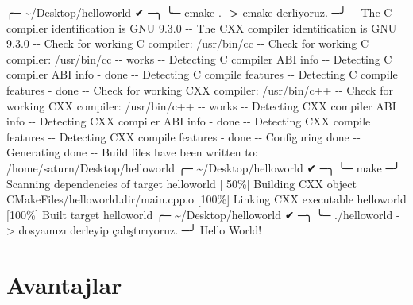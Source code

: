 \documentclass[
]{book}
\newenvironment{Shaded}{\begin{snugshade}}{\end{snugshade}}
\newcommand{\BuiltInTok}[1]{#1}
\newcommand{\ExtensionTok}[1]{#1}
\newcommand{\FunctionTok}[1]{\textcolor[rgb]{0.00,0.00,0.00}{#1}}
\newcommand{\NormalTok}[1]{#1}
\newcommand{\OperatorTok}[1]{\textcolor[rgb]{0.81,0.36,0.00}{\textbf{#1}}}
\newcommand{\OtherTok}[1]{\textcolor[rgb]{0.56,0.35,0.01}{#1}}
\begin{document}
\begin{Shaded}
\begin{Highlighting}[]
\NormalTok{╭─ }\ExtensionTok{\textasciitilde{}/Desktop/helloworld}\NormalTok{                                                   ✔ ─╮}
\NormalTok{╰─ }\FunctionTok{cmake}\NormalTok{ .  {-}}\OperatorTok{>}\NormalTok{ cmake derliyoruz.                                            ─╯}
\ExtensionTok{{-}{-}}\NormalTok{ The C compiler identification is GNU 9.3.0}
\ExtensionTok{{-}{-}}\NormalTok{ The CXX compiler identification is GNU 9.3.0}
\ExtensionTok{{-}{-}}\NormalTok{ Check for working C compiler: /usr/bin/cc}
\ExtensionTok{{-}{-}}\NormalTok{ Check for working C compiler: /usr/bin/cc {-}{-} works}
\ExtensionTok{{-}{-}}\NormalTok{ Detecting C compiler ABI info}
\ExtensionTok{{-}{-}}\NormalTok{ Detecting C compiler ABI info {-} done}
\ExtensionTok{{-}{-}}\NormalTok{ Detecting C compile features}
\ExtensionTok{{-}{-}}\NormalTok{ Detecting C compile features {-} done}
\ExtensionTok{{-}{-}}\NormalTok{ Check for working CXX compiler: /usr/bin/c++}
\ExtensionTok{{-}{-}}\NormalTok{ Check for working CXX compiler: /usr/bin/c++ {-}{-} works}
\ExtensionTok{{-}{-}}\NormalTok{ Detecting CXX compiler ABI info}
\ExtensionTok{{-}{-}}\NormalTok{ Detecting CXX compiler ABI info {-} done}
\ExtensionTok{{-}{-}}\NormalTok{ Detecting CXX compile features}
\ExtensionTok{{-}{-}}\NormalTok{ Detecting CXX compile features {-} done}
\ExtensionTok{{-}{-}}\NormalTok{ Configuring done}
\ExtensionTok{{-}{-}}\NormalTok{ Generating done}
\ExtensionTok{{-}{-}}\NormalTok{ Build files have been written to: /home/saturn/Desktop/helloworld}
\NormalTok{╭─ }\ExtensionTok{\textasciitilde{}/Desktop/helloworld}\NormalTok{                                                   ✔ ─╮}
\NormalTok{╰─ }\FunctionTok{make}\NormalTok{                                                                     ─╯}
\ExtensionTok{Scanning}\NormalTok{ dependencies of target helloworld}
\BuiltInTok{[}\NormalTok{ 50\%] Building CXX object CMakeFiles/helloworld.dir/main.cpp.o}
\NormalTok{[100\%] Linking CXX executable helloworld}
\NormalTok{[100\%] Built target helloworld}
\NormalTok{╭─ \textasciitilde{}/Desktop/helloworld                                                   ✔ ─╮}
\NormalTok{╰─ ./helloworld {-}}\OtherTok{>}\NormalTok{ dosyamızı derleyip çalıştırıyoruz.                       ─╯}
\NormalTok{Hello World!}
\end{Highlighting}
\end{Shaded}

\hypertarget{avantajlar-1}{%
\section*{Avantajlar}\label{avantajlar-1}}
\end{document}
